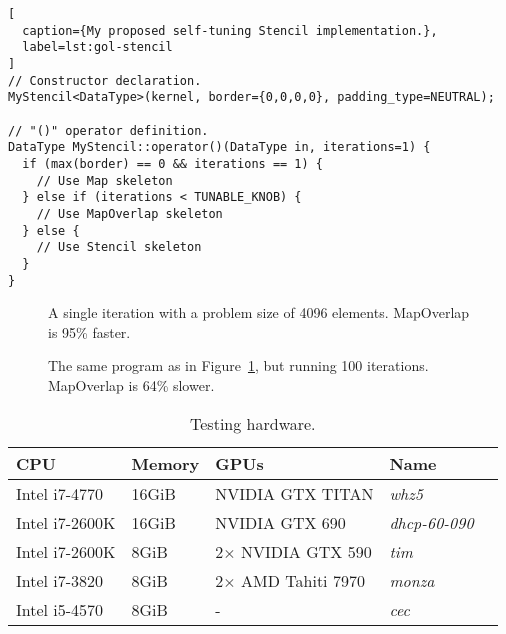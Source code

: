 \newpage
\lstset{language=C++}
\begin{lstlisting}[
  caption={My proposed self-tuning Stencil implementation.},
  label=lst:gol-stencil
]
// Constructor declaration.
MyStencil<DataType>(kernel, border={0,0,0,0}, padding_type=NEUTRAL);

// "()" operator definition.
DataType MyStencil::operator()(DataType in, iterations=1) {
  if (max(border) == 0 && iterations == 1) {
    // Use Map skeleton
  } else if (iterations < TUNABLE_KNOB) {
    // Use MapOverlap skeleton
  } else {
    // Use Stencil skeleton
  }
}
\end{lstlisting}

\begin{figure}


\caption{A single iteration with a problem size of 4096 elements. MapOverlap is 95\% faster.}
\label{fig:1iter}
\end{figure}

\begin{figure}


\caption{The same program as in Figure~\ref{fig:1iter}, but running 100 iterations. MapOverlap is 64\% slower.}
\label{fig:}
\end{figure}

\begin{table}
\footnotesize
\centering
\begin{tabular}{| l | l | l | l | l |}
\hline
\textbf{CPU} & \textbf{Memory} & \textbf{GPUs} & \textbf{Name}\\
\hline
Intel i7-4770 & 16GiB & NVIDIA GTX TITAN & \textit{whz5}\\
Intel i7-2600K & 16GiB & NVIDIA GTX 690 & \textit{dhcp-60-090}\\
Intel i7-2600K & 8GiB & 2$\times$ NVIDIA GTX 590 & \textit{tim}\\
Intel i7-3820 & 8GiB & 2$\times$ AMD Tahiti 7970 & \textit{monza}\\
Intel i5-4570 & 8GiB & - & \textit{cec}\\
\hline
\end{tabular}
\caption{%
  Testing hardware.%
}
\label{tab:hw}
\end{table}



